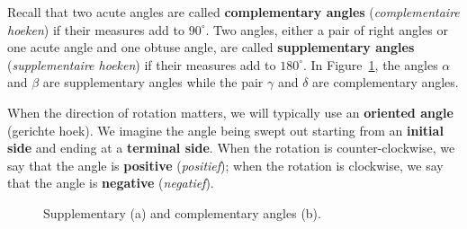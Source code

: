 \fi
Recall that two acute angles are called \textbf{complementary angles} (\textit{complementaire hoeken}) if their measures add to $90^{\circ}$.  Two angles, either a pair of right angles or one acute angle and one obtuse angle, are called \textbf{supplementary angles} (\textit{supplementaire hoeken}) if their measures add to $180^{\circ}$. In Figure~\ref{fig_trans_7},  the angles $\alpha$ and $\beta$ are supplementary angles while the pair $\gamma$ and $\delta$ are complementary angles.



When the direction of rotation matters, we will typically use an \textbf{oriented angle} (gerichte hoek).  We imagine the angle being swept out starting from an \textbf{initial side} and ending at a \textbf{terminal side}. When the rotation is counter-clockwise, we say that the angle is \textbf{positive} (\textit{positief}); when the rotation is clockwise, we say that the angle is \textbf{negative} (\textit{negatief}).

\begin{figure}[H]
\centering
\centerline{
\hspace{1cm}
}
\caption{Supplementary (a) and complementary angles (b). }
\label{fig_trans_7}
\end{figure}


